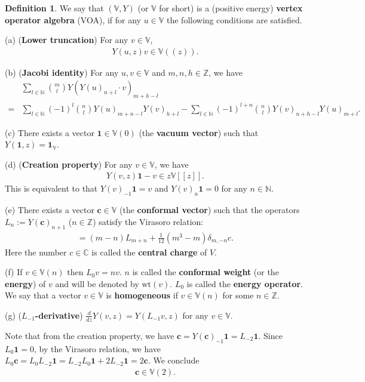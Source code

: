 \documentclass[12pt,b5paper,notitlepage]{report}
\theoremstyle{definition}
\newtheorem{df}{Definition}[section]
\theoremstyle{plain}
\newcommand{\wtd}{\widetilde}
\newcommand{\id}{\mathbf{1}}
\newcommand{\mbb}{\mathbb}
\newcommand{\mbf}{\mathbf}
\newcommand{\Vbb}{\mathbb V}
\newcommand{\cbf}{\mathbf c}
\newcommand{\wt}{\mathrm{wt}}
\numberwithin{equation}{section}
\begin{document}
\begin{df}
We say that $(\mbb V,Y)$ (or $\mbb V$ for short) is a (positive energy) \textbf{vertex operator algebra} (VOA), if for any $u\in\Vbb$  the following conditions are satisfied.

(a) (\textbf{Lower truncation}) For any $v\in \Vbb$, 
\begin{gather*}
Y(u,z)v\in\Vbb((z)).
\end{gather*}

(b) (\textbf{Jacobi identity}) For any $u,v\in \Vbb$ and $m,n,h\in\mathbb Z$, we have
\begin{align}
&\sum_{l\in\mathbb N}{m\choose l}Y(Y(u)_{n+l}\cdot v)_{m+h-l}\nonumber\\
=&\sum_{l\in\mathbb N}(-1)^l{n\choose l}Y(u)_{m+n-l}Y(v)_{h+l}-\sum_{l\in\mathbb N}(-1)^{l+n}{n\choose l}Y(v)_{n+h-l}Y(u)_{m+l}.\label{eq39}
\end{align}

(c) There exists a vector $\mbf 1\in \Vbb(0)$ (the \textbf{vacuum vector}) \index{1@$\id$} such that $Y(\mbf 1,z)=\id_\Vbb$.

(d) (\textbf{Creation property}) For any $v\in\Vbb$, we have
\begin{align*}
Y(v,z)\id-v\in z\Vbb[[z]].
\end{align*}
This is equivalent to that $Y(v)_{-1}\id=v$ and $Y(v)_n\id=0$ for any $n\in\mathbb N$.

(e) There exists a vector $\cbf\in \Vbb$ (the \textbf{conformal vector}) \index{c@$\cbf$} such that the operators $L_n:=Y(\cbf)_{n+1}$ ($n\in\mathbb Z$) satisfy the Virasoro relation:
\begin{gather}
[L_m,L_n]=(m-n)L_{m+n}+\frac 1 {12}(m^3-m)\delta_{m,-n}c.\label{eq40}
\end{gather}
Here the number $c\in\mathbb C$ is called the \textbf{central charge} of $V$.

(f) If $v\in \Vbb(n)$ then $L_0v=nv$. $n$ is called the \textbf{conformal weight} (or the \textbf{energy}) of $v$ and will be denoted by $\wt(v)$. \index{wt@$\wt(v),\wt(w),\wtd\wt(w)$} $L_0$ is called the \textbf{energy operator}. We say that a vector $v\in \mbb V$ is \textbf{homogeneous} if $v\in\mbb V(n)$ for some $n\in\mbb Z$.

(g)	(\textbf{$L_{-1}$-derivative}) $\frac d{dz} Y(v,z)=Y(L_{-1}v,z)$ for any $v\in\Vbb$.
\end{df}

Note that from the creation property, we have $\cbf=Y(\cbf)_{-1}\id=L_{-2}\id$. Since $L_0\id=0$, by the Virasoro relation, we have $L_0\cbf=L_0L_{-2}\id=L_{-2}L_0\id+2L_{-2}\id=2\cbf$. We conclude
\begin{align*}
\cbf\in\Vbb(2).
\end{align*}
\end{document}
